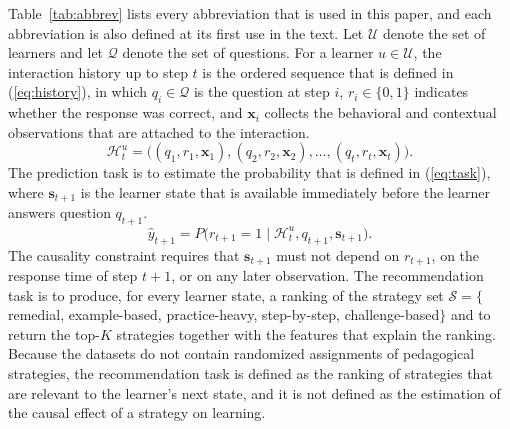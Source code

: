 \documentclass[11pt]{article}
\begin{document}
Table~\ref{tab:abbrev} lists every abbreviation that is used in this paper, and each abbreviation is also defined at its first use in the text. Let $\mathcal{U}$ denote the set of learners and let $\mathcal{Q}$ denote the set of questions. For a learner $u \in \mathcal{U}$, the interaction history up to step $t$ is the ordered sequence that is defined in (\ref{eq:history}), in which $q_i \in \mathcal{Q}$ is the question at step $i$, $r_i \in \{0,1\}$ indicates whether the response was correct, and $\mathbf{x}_i$ collects the behavioral and contextual observations that are attached to the interaction.
\begin{equation}\label{eq:history}
\mathcal{H}_t^{u} = \big((q_1, r_1, \mathbf{x}_1), (q_2, r_2, \mathbf{x}_2), \dots, (q_t, r_t, \mathbf{x}_t)\big).
\end{equation}
The prediction task is to estimate the probability that is defined in (\ref{eq:task}), where $\mathbf{s}_{t+1}$ is the learner state that is available immediately before the learner answers question $q_{t+1}$.
\begin{equation}\label{eq:task}
\hat{y}_{t+1} = P\big(r_{t+1} = 1 \mid \mathcal{H}_t^{u}, q_{t+1}, \mathbf{s}_{t+1}\big).
\end{equation}
The causality constraint requires that $\mathbf{s}_{t+1}$ must not depend on $r_{t+1}$, on the response time of step $t+1$, or on any later observation. The recommendation task is to produce, for every learner state, a ranking of the strategy set $\mathcal{S} = \{$remedial, example-based, practice-heavy, step-by-step, challenge-based$\}$ and to return the top-$K$ strategies together with the features that explain the ranking. Because the datasets do not contain randomized assignments of pedagogical strategies, the recommendation task is defined as the ranking of strategies that are relevant to the learner's next state, and it is not defined as the estimation of the causal effect of a strategy on learning.
\end{document}
